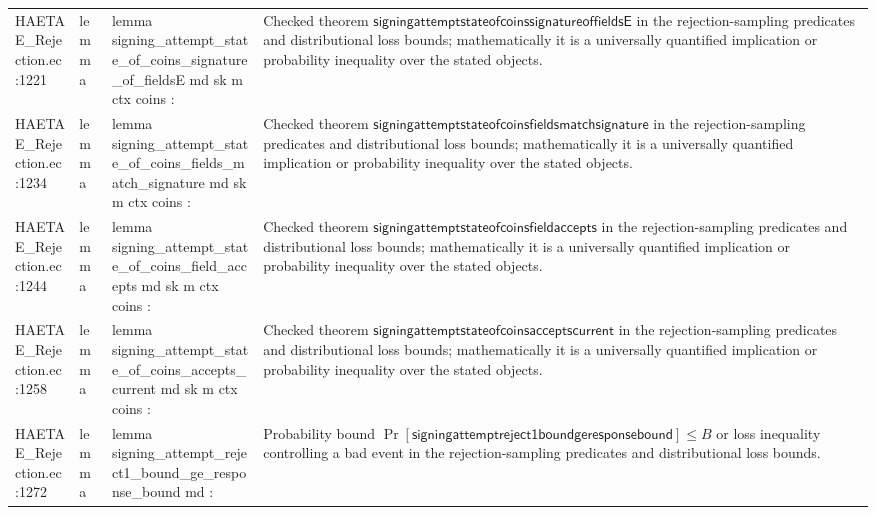 \documentclass[10pt]{article}
\begin{document}
\begin{longtable}{L{0.11\textwidth}L{0.055\textwidth}L{0.385\textwidth}L{0.41\textwidth}}
HAETAE\_\allowbreak{}Rejection.\allowbreak{}ec:\allowbreak{}1221 & lemma & {\ttfamily\scriptsize lemma signing\_\allowbreak{}attempt\_\allowbreak{}state\_\allowbreak{}of\_\allowbreak{}coins\_\allowbreak{}signature\_\allowbreak{}of\_\allowbreak{}fieldsE md sk m ctx coins :} & Checked theorem $\mathsf{signingattemptstateofcoinssignatureoffieldsE}$ in the rejection-sampling predicates and distributional loss bounds; mathematically it is a universally quantified implication or probability inequality over the stated objects. \\
HAETAE\_\allowbreak{}Rejection.\allowbreak{}ec:\allowbreak{}1234 & lemma & {\ttfamily\scriptsize lemma signing\_\allowbreak{}attempt\_\allowbreak{}state\_\allowbreak{}of\_\allowbreak{}coins\_\allowbreak{}fields\_\allowbreak{}match\_\allowbreak{}signature md sk m ctx coins :} & Checked theorem $\mathsf{signingattemptstateofcoinsfieldsmatchsignature}$ in the rejection-sampling predicates and distributional loss bounds; mathematically it is a universally quantified implication or probability inequality over the stated objects. \\
HAETAE\_\allowbreak{}Rejection.\allowbreak{}ec:\allowbreak{}1244 & lemma & {\ttfamily\scriptsize lemma signing\_\allowbreak{}attempt\_\allowbreak{}state\_\allowbreak{}of\_\allowbreak{}coins\_\allowbreak{}field\_\allowbreak{}accepts md sk m ctx coins :} & Checked theorem $\mathsf{signingattemptstateofcoinsfieldaccepts}$ in the rejection-sampling predicates and distributional loss bounds; mathematically it is a universally quantified implication or probability inequality over the stated objects. \\
HAETAE\_\allowbreak{}Rejection.\allowbreak{}ec:\allowbreak{}1258 & lemma & {\ttfamily\scriptsize lemma signing\_\allowbreak{}attempt\_\allowbreak{}state\_\allowbreak{}of\_\allowbreak{}coins\_\allowbreak{}accepts\_\allowbreak{}current md sk m ctx coins :} & Checked theorem $\mathsf{signingattemptstateofcoinsacceptscurrent}$ in the rejection-sampling predicates and distributional loss bounds; mathematically it is a universally quantified implication or probability inequality over the stated objects. \\
HAETAE\_\allowbreak{}Rejection.\allowbreak{}ec:\allowbreak{}1272 & lemma & {\ttfamily\scriptsize lemma signing\_\allowbreak{}attempt\_\allowbreak{}reject1\_\allowbreak{}bound\_\allowbreak{}ge\_\allowbreak{}response\_\allowbreak{}bound md :} & Probability bound $\Pr[\mathsf{signingattemptreject1boundgeresponsebound}]\le B$ or loss inequality controlling a bad event in the rejection-sampling predicates and distributional loss bounds. \\

\end{longtable}
\end{document}
